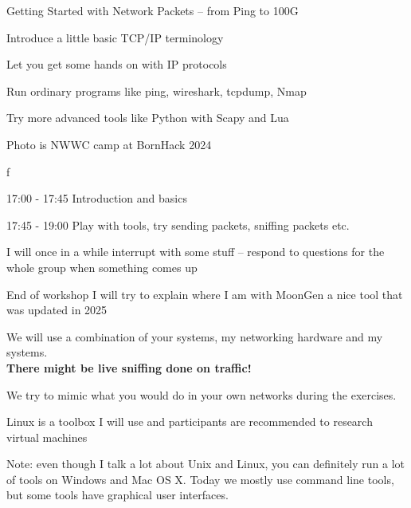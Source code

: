 \documentclass[Screen16to9,17pt]{foils}
\begin{document}


\hlkprofiluk



Getting Started with Network Packets -- from Ping to 100G

\begin{list2}
\item Introduce a little basic TCP/IP terminology
\item Let you get some hands on with IP protocols
\item Run ordinary programs like ping, wireshark, tcpdump, Nmap
\item Try more advanced tools like Python with Scapy and Lua
\end{list2}

Photo is NWWC camp at BornHack 2024 


f

\begin{list2}
\item 17:00 - 17:45 Introduction and basics
\item 17:45 - 19:00 Play with tools, try sending packets, sniffing packets etc.
\item I will once in a while interrupt with some stuff -- respond to questions for the whole group when something comes up
\item End of workshop I will try to explain where I am with MoonGen a nice tool that was updated in 2025
\end{list2}


We will use a combination of your systems, my networking hardware and my systems.\\
{\color{red} \bf There might be live sniffing done on traffic!}

We try to mimic what you would do in your own networks during the exercises.

Linux is a toolbox I will use and participants are recommended to research virtual machines

Note: even though I talk a lot about Unix and Linux, you can definitely run a lot of tools on Windows and Mac OS X. Today we mostly use command line tools, but some tools have graphical user interfaces.
\end{document}

